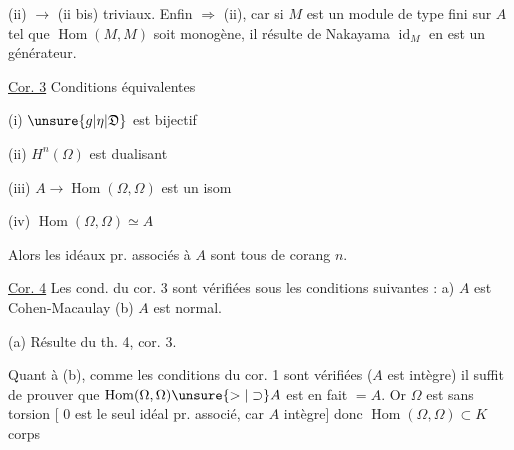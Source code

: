 (ii) $\longrightarrow$ (ii bis) triviaux. Enfin  $\Rightarrow$ (ii), car
si $M$ est un module de type fini sur $A$ tel que
$\operatorname{Hom}(M,M)$ soit monogène, il résulte de Nakayama 
$\operatorname{id}_M$ en est un générateur.

\uline{Cor. 3} Conditions équivalentes

(i) $\unsure{g|\eta|\mathfrak D}$ est bijectif

(ii) $H^n(\Omega)$ est dualisant

(iii) $A\to\operatorname{Hom}(\Omega,\Omega)$ est un isom

(iv) $\operatorname{Hom}(\Omega,\Omega)\simeq A$

 Alors  les idéaux pr. associés à $A$
sont tous de  corang $n$.

\uline{Cor. 4} Les cond. du cor. 3 sont vérifiées
sous les conditions suivantes : a) $A$ est
Cohen-Macaulay \qquad (b) $A$ est normal.

 (a) Résulte du th. 4, cor. 3.

Quant à (b), comme les conditions du cor. 1
sont vérifiées ($A$ est intègre) il suffit
de prouver que $\operatorname{Hom}(\Omega,\Omega)\unsure{>|\supset} A$ est en
fait $=A$. Or $\Omega$ est sans torsion
[ $0$ est le seul idéal pr. associé,
car $A$ intègre] donc $\operatorname{Hom}(\Omega,\Omega)\subset K$ corps

